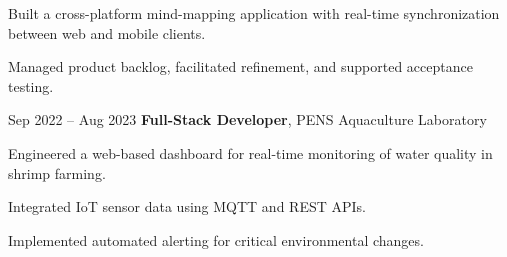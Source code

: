 \vspace{0.10 cm}


\begin{onecolentry}
	\begin{highlights}
		\item Built a cross-platform mind-mapping application with real-time synchronization between web and mobile clients.
		\item Managed product backlog, facilitated refinement, and supported acceptance testing.
	\end{highlights}
\end{onecolentry}

\vspace{0.5 cm}


\begin{twocolentrydate}{Sep 2022 -- Aug 2023}
	\textbf{Full-Stack Developer}, PENS Aquaculture Laboratory
\end{twocolentrydate}

\vspace{0.10 cm}


\begin{onecolentry}
	\begin{highlights}
		\item Engineered a web-based dashboard for real-time monitoring of water quality in shrimp farming.
		\item Integrated IoT sensor data using MQTT and REST APIs.
		\item Implemented automated alerting for critical environmental changes.
	\end{highlights}
\end{onecolentry}
